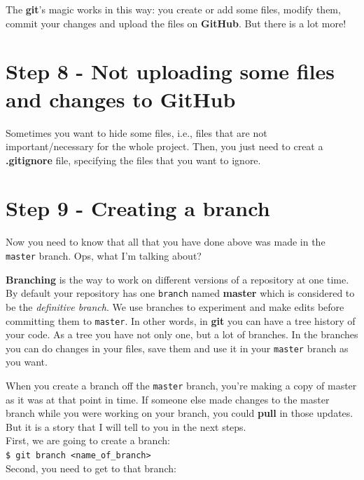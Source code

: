 \documentclass[12pt,a4paper,titlepage,brazil]{article}
\begin{document}
{The {\bf git}'s magic works in this way: you create or add some files, modify them, commit your changes and upload the files on {\bf GitHub}. But there is a lot more!


\section{Step 8 - Not uploading some files and changes to GitHub}

Sometimes you want to hide some files, i.e., files that are not important/necessary for the whole project. Then, you just need to creat a {\bf .gitignore} file, specifying the files that you want to ignore.


\section{Step 9 - Creating a branch}

Now you need to know that all that you have done above was made in the \texttt{master} branch. Ops, what I'm talking about?

{\bf Branching} is the way to work on different versions of a repository at one time. By default your repository has one \texttt{branch} named {\bf master} which is considered to be the {\em definitive branch}. We use branches to experiment and make edits before committing them to \texttt{master}. In other words, in {\bf git} you can have a tree history of your code. As a tree you have not only one, but a lot of branches. In the branches you can do changes in your files, save them and use it in your \texttt{master} branch as you want.

When you create a branch off the \texttt{master} branch, you’re making a copy of master as it was at that point in time. If someone else made changes to the master branch while you were working on your branch, you could {\bf pull} in those updates. But it is a story that I will tell to you in the next steps.\\

First, we are going to create a branch:\\

\texttt{\$ git branch <name\_of\_branch>}\\

Second, you need to get to that branch:\\

}
\end{document}

